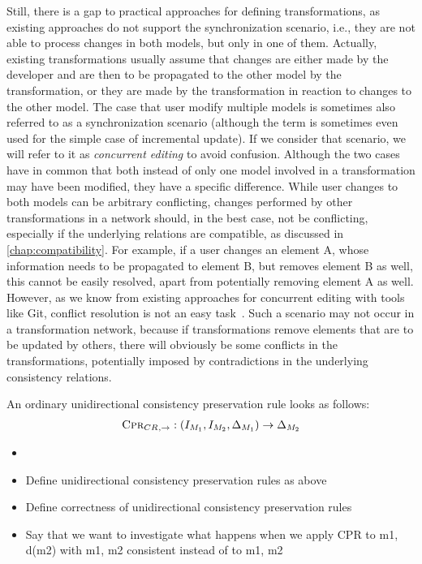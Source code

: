 Still, there is a gap to practical approaches for defining transformations, as existing approaches do not support the synchronization scenario, i.e., they are not able to process changes in both models, but only in one of them.
Actually, existing transformations usually assume that changes are either made by the developer and are then to be propagated to the other model by the transformation, or they are made by the transformation in reaction to changes to the other model.
The case that user modify multiple models is sometimes also referred to as a synchronization scenario (although the term is sometimes even used for the simple case of incremental update).
If we consider that scenario, we will refer to it as \emph{concurrent editing} to avoid confusion.
Although the two cases have in common that both instead of only one model involved in a transformation may have been modified, they have a specific difference.
While user changes to both models can be arbitrary conflicting, changes performed by other transformations in a network should, in the best case, not be conflicting, especially if the underlying relations are compatible, as discussed in \autoref{chap:compatibility}.
For example, if a user changes an element A, whose information needs to be propagated to element B, but removes element B as well, this cannot be easily resolved, apart from potentially removing element A as well.
However, as we know from existing approaches for concurrent editing with tools like Git, conflict resolution is not an easy task~.
Such a scenario may not occur in a transformation network, because if transformations remove elements that are to be updated by others, there will obviously be some conflicts in the transformations, potentially imposed by contradictions in the underlying consistency relations.

An ordinary unidirectional consistency preservation rule looks as follows:
\begin{align*}
    \textsc{Cpr}_{CR_{},\rightarrow} : (I_{M_{1}}, I_{M_{2}}, \Delta_{M_{1}}) \rightarrow \Delta_{M_{2}}
\end{align*}



\begin{itemize}
    \item 
    \item Define unidirectional consistency preservation rules as above
    \item Define correctness of unidirectional consistency preservation rules
    \item Say that we want to investigate what happens when we apply CPR to m1, d(m2) with m1, m2 consistent instead of to m1, m2
\end{itemize}



